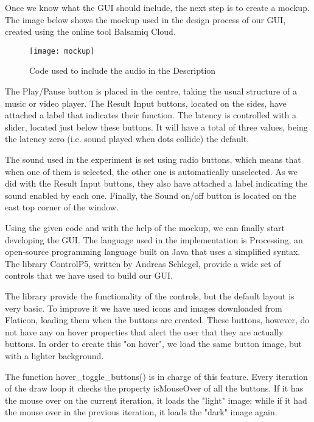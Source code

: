 Once we know what the GUI should include, the next step is to create a mockup. The image below shows the mockup used in the design process of our GUI, created using the online tool Balsamiq Cloud. 

\begin{figure}[!ht]
		\centering
		\vspace{0.5cm}
		\texttt{[image: mockup]}
		\caption{Code used to include the audio in the Description}
\end{figure} 

 The Play/Pause button is placed in the centre, taking the usual structure of a music or video player. The Result Input buttons, located on the sides, have attached a label that indicates their function. The latency is controlled with a slider, located just below these buttons. It will have a total of three values, being the latency zero (i.e. sound played when dots collide) the default.

The sound used in the experiment is set using radio buttons, which means that when one of them is selected, the other one is automatically unselected. As we did with the Result Input buttons, they also have attached a label indicating the sound enabled by each one. Finally, the Sound on/off button is located on the east top corner of the window.

Using the given code and with the help of the mockup, we can finally start developing the GUI. The language used in the implementation is Processing, an open-source programming language built on Java that uses a simplified syntax. The library ControlP5, written by Andreas Schlegel, provide a wide set of controls that we have used to build our GUI.

The library provide the functionality of the controls, but the default layout is very basic. To improve it we have used icons and images downloaded from Flaticon, loading them when the buttons are created. These buttons, however, do not have any on hover properties that alert the user that they are actually buttons. In order to create this "on hover", we load the same button image, but with a lighter background.

The function hover{\_}toggle{\_}buttons() is in charge of this feature. Every iteration of the draw loop it checks the property isMouseOver of all the buttons. If it has the mouse over on the current iteration, it loads the "light" image; while if it had the mouse over in the previous iteration, it loads the "dark" image again.

